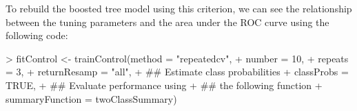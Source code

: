 \documentclass[12pt]{article}
\renewenvironment{Schunk}{\vspace{\topsep}}{\vspace{\topsep}}
\begin{document}
To rebuild the boosted tree model using this criterion, we
can see the relationship between the tuning parameters and
the area under the ROC curve using the following code: 
\begin{small}
\begin{Schunk}
\begin{Sinput}
> fitControl <- trainControl(method = "repeatedcv",
+                            number = 10,
+                            repeats = 3,
+                            returnResamp = "all",
+                            ## Estimate class probabilities
+                            classProbs = TRUE,
+                            ## Evaluate performance using 
+                            ## the following function
+                            summaryFunction = twoClassSummary)
\end{Sinput}
\end{Schunk}
\end{small}
\end{document}
